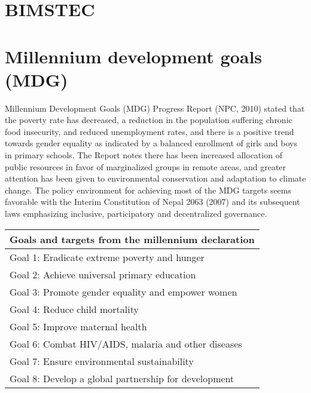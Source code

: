 \documentclass[
  openany]{book}
\begin{document}
\hypertarget{bimstec}{%
\section{BIMSTEC}\label{bimstec}}

\hypertarget{millennium-development-goals-mdg}{%
\section{Millennium development goals (MDG)}\label{millennium-development-goals-mdg}}

Millennium Development Goals (MDG) Progress Report (NPC, 2010) stated that the poverty rate has decreased, a reduction in the population suffering chronic food insecurity, and reduced unemployment rates, and there is a positive trend towards gender equality as indicated by a balanced enrollment of girls and boys in primary schools. The Report notes there has been increased allocation of public resources in favor of marginalized groups in remote areas, and greater attention has been given to environmental conservation and adaptation to climate change. The policy environment for achieving most of the MDG targets seems favorable with the Interim Constitution of Nepal 2063 (2007) and its subsequent laws emphasizing inclusive, participatory and decentralized governance.

\begin{longtable}{l}
\toprule
Goals and targets from the millennium declaration\\
\midrule
Goal 1: Eradicate extreme poverty and hunger\\
Goal 2:  Achieve universal primary education\\
Goal 3:  Promote gender equality and empower women\\
Goal 4:  Reduce child mortality\\
Goal 5:  Improve maternal health\\
\addlinespace
Goal 6:  Combat HIV/AIDS, malaria and other diseases\\
Goal 7:  Ensure environmental sustainability\\
Goal 8:  Develop a global partnership for development\\
\bottomrule
\end{longtable}
\end{document}
